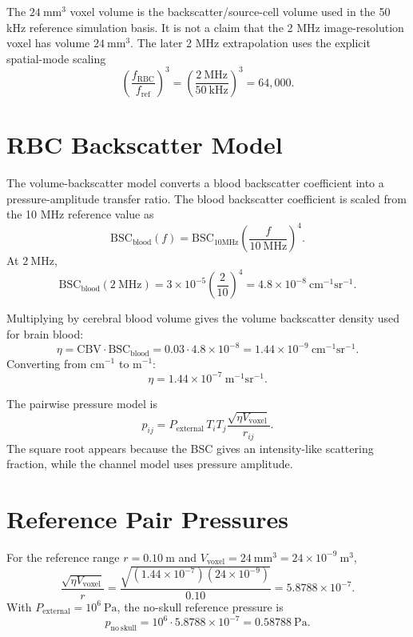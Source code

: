 \documentclass[11pt]{article}
\begin{document}
The \(24~\mathrm{mm}^{3}\) voxel volume is the backscatter/source-cell volume
used in the 50 kHz reference simulation basis.  It is not a claim that the
2 MHz image-resolution voxel has volume \(24~\mathrm{mm}^{3}\).  The later
2 MHz extrapolation uses the explicit spatial-mode scaling
\[
  \left(\frac{f_{\mathrm{RBC}}}{f_{\mathrm{ref}}}\right)^3
  =
  \left(\frac{2~\mathrm{MHz}}{50~\mathrm{kHz}}\right)^3
  =
  64{,}000.
\]

\section*{RBC Backscatter Model}

The volume-backscatter model converts a blood backscatter coefficient into a
pressure-amplitude transfer ratio.  The blood backscatter coefficient is
scaled from the 10 MHz reference value as
\[
  \mathrm{BSC}_{\mathrm{blood}}(f)
  =
  \mathrm{BSC}_{10\mathrm{MHz}}
  \left(\frac{f}{10~\mathrm{MHz}}\right)^4.
\]
At \(2~\mathrm{MHz}\),
\[
  \mathrm{BSC}_{\mathrm{blood}}(2~\mathrm{MHz})
  =
  3\times 10^{-5}
  \left(\frac{2}{10}\right)^4
  =
  4.8\times 10^{-8}~\mathrm{cm}^{-1}\mathrm{sr}^{-1}.
\]

Multiplying by cerebral blood volume gives the volume backscatter density
used for brain blood:
\[
  \eta
  =
  \mathrm{CBV}\cdot \mathrm{BSC}_{\mathrm{blood}}
  =
  0.03\cdot 4.8\times 10^{-8}
  =
  1.44\times 10^{-9}~\mathrm{cm}^{-1}\mathrm{sr}^{-1}.
\]
Converting from \(\mathrm{cm}^{-1}\) to \(\mathrm{m}^{-1}\):
\[
  \eta = 1.44\times 10^{-7}~\mathrm{m}^{-1}\mathrm{sr}^{-1}.
\]

The pairwise pressure model is
\[
  p_{ij}
  =
  P_{\mathrm{external}}\,
  T_i T_j
  \frac{\sqrt{\eta V_{\mathrm{voxel}}}}{r_{ij}}.
\]
The square root appears because the BSC gives an intensity-like scattering
fraction, while the channel model uses pressure amplitude.

\section*{Reference Pair Pressures}

For the reference range \(r=0.10~\mathrm{m}\) and
\(V_{\mathrm{voxel}}=24~\mathrm{mm}^3=24\times 10^{-9}~\mathrm{m}^3\),
\[
  \frac{\sqrt{\eta V_{\mathrm{voxel}}}}{r}
  =
  \frac{\sqrt{(1.44\times 10^{-7})(24\times 10^{-9})}}{0.10}
  =
  5.8788\times 10^{-7}.
\]
With \(P_{\mathrm{external}}=10^6~\mathrm{Pa}\), the no-skull reference pressure is
\[
  p_{\mathrm{no\ skull}}
  =
  10^6 \cdot 5.8788\times 10^{-7}
  =
  0.58788~\mathrm{Pa}.
\]
\end{document}
